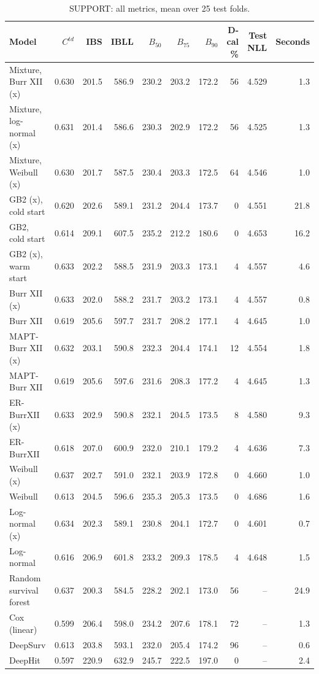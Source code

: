 \begin{table}[htbp]
\centering
\caption{SUPPORT: all metrics, mean over 25 test folds.}\label{stab:real_support}
\footnotesize
\begin{tabular}{lrrrrrrrrr}
\toprule
Model & $C^{td}$ & IBS & IBLL & $B_{50}$ & $B_{75}$ & $B_{90}$ & D-cal \% & Test NLL & Seconds \\
\midrule
Mixture, Burr XII (x) & 0.630 & 201.5 & 586.9 & 230.2 & 203.2 & 172.2 & 56 & 4.529 & 1.3 \\
Mixture, log-normal (x) & 0.631 & 201.4 & 586.6 & 230.3 & 202.9 & 172.2 & 56 & 4.525 & 1.3 \\
Mixture, Weibull (x) & 0.630 & 201.7 & 587.5 & 230.4 & 203.3 & 172.5 & 64 & 4.546 & 1.0 \\
GB2 (x), cold start & 0.620 & 202.6 & 589.1 & 231.2 & 204.4 & 173.7 & 0 & 4.551 & 21.8 \\
GB2, cold start & 0.614 & 209.1 & 607.5 & 235.2 & 212.2 & 180.6 & 0 & 4.653 & 16.2 \\
GB2 (x), warm start & 0.633 & 202.2 & 588.5 & 231.9 & 203.3 & 173.1 & 4 & 4.557 & 4.6 \\
Burr XII (x) & 0.633 & 202.0 & 588.2 & 231.7 & 203.2 & 173.1 & 4 & 4.557 & 0.8 \\
Burr XII & 0.619 & 205.6 & 597.7 & 231.7 & 208.2 & 177.1 & 4 & 4.645 & 1.0 \\
MAPT-Burr XII (x) & 0.632 & 203.1 & 590.8 & 232.3 & 204.4 & 174.1 & 12 & 4.554 & 1.8 \\
MAPT-Burr XII & 0.619 & 205.6 & 597.6 & 231.6 & 208.3 & 177.2 & 4 & 4.645 & 1.3 \\
ER-BurrXII (x) & 0.633 & 202.9 & 590.8 & 232.1 & 204.5 & 173.5 & 8 & 4.580 & 9.3 \\
ER-BurrXII & 0.618 & 207.0 & 600.9 & 232.0 & 210.1 & 179.2 & 4 & 4.636 & 7.3 \\
Weibull (x) & 0.637 & 202.7 & 591.0 & 232.1 & 203.9 & 172.8 & 0 & 4.660 & 1.0 \\
Weibull & 0.613 & 204.5 & 596.6 & 235.3 & 205.3 & 173.5 & 0 & 4.686 & 1.6 \\
Log-normal (x) & 0.634 & 202.3 & 589.1 & 230.8 & 204.1 & 172.7 & 0 & 4.601 & 0.7 \\
Log-normal & 0.616 & 206.9 & 601.8 & 233.2 & 209.3 & 178.5 & 4 & 4.648 & 1.5 \\
Random survival forest & 0.637 & 200.3 & 584.5 & 228.2 & 202.1 & 173.0 & 56 & -- & 24.9 \\
Cox (linear) & 0.599 & 206.4 & 598.0 & 234.2 & 207.6 & 178.1 & 72 & -- & 1.3 \\
DeepSurv & 0.613 & 203.8 & 593.1 & 232.0 & 205.4 & 174.2 & 96 & -- & 0.6 \\
DeepHit & 0.597 & 220.9 & 632.9 & 245.7 & 222.5 & 197.0 & 0 & -- & 2.4 \\
\bottomrule
\end{tabular}


\end{table}
